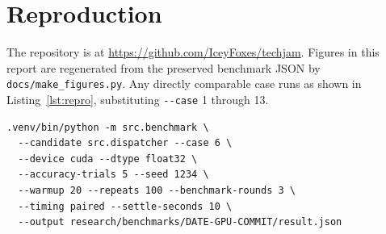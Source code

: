 \documentclass[10pt,conference,compsoc]{IEEEtran}
\begin{document}
\section*{Reproduction}
The repository is at \url{https://github.com/IceyFoxes/techjam}. Figures in this report are regenerated from the preserved benchmark JSON by \texttt{docs/make\_figures.py}. Any directly comparable case runs as shown in Listing~\ref{lst:repro}, substituting \texttt{-{}-case} 1 through 13.

\begin{lstlisting}[style=code,caption={Reproducing one official case.},label={lst:repro}]
.venv/bin/python -m src.benchmark \
  --candidate src.dispatcher --case 6 \
  --device cuda --dtype float32 \
  --accuracy-trials 5 --seed 1234 \
  --warmup 20 --repeats 100 --benchmark-rounds 3 \
  --timing paired --settle-seconds 10 \
  --output research/benchmarks/DATE-GPU-COMMIT/result.json
\end{lstlisting}
\end{document}
